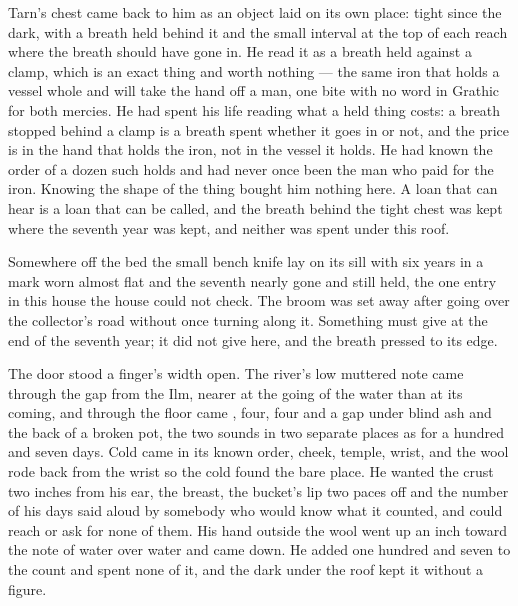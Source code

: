 Tarn's chest came back to him as an object laid on its own place: tight since the dark, with a breath held behind it and the small interval at the top of each reach where the breath should have gone in. He read it as a breath held against a clamp, which is an exact thing and worth nothing --- the same iron that holds a vessel whole and will take the hand off a man, one bite with no word in Grathic for both mercies. He had spent his life reading what a held thing costs: a breath stopped behind a clamp is a breath spent whether it goes in or not, and the price is in the hand that holds the iron, not in the vessel it holds. He had known the order of a dozen such holds and had never once been the man who paid for the iron. Knowing the shape of the thing bought him nothing here. A loan that can hear is a loan that can be called, and the breath behind the tight chest was kept where the seventh year was kept, and neither was spent under this roof.

Somewhere off the bed the small bench knife lay on its sill with six years in a mark worn almost flat and the seventh nearly gone and still held, the one entry in this house the house could not check. The broom was set away after going over the collector's road without once turning along it. Something must give at the end of the seventh year; it did not give here, and the breath pressed to its edge.

The door stood a finger's width open. The river's low muttered note came through the gap from the Ilm, nearer at the going of the water than at its coming, and through the floor came , four, four and a gap under blind ash and the back of a broken pot, the two sounds in two separate places as for a hundred and seven days. Cold came in its known order, cheek, temple, wrist, and the wool rode back from the wrist so the cold found the bare place. He wanted the crust two inches from his ear, the breast, the bucket's lip two paces off and the number of his days said aloud by somebody who would know what it counted, and could reach or ask for none of them. His hand outside the wool went up an inch toward the note of water over water and came down. He added one hundred and seven to the count and spent none of it, and the dark under the roof kept it without a figure.
